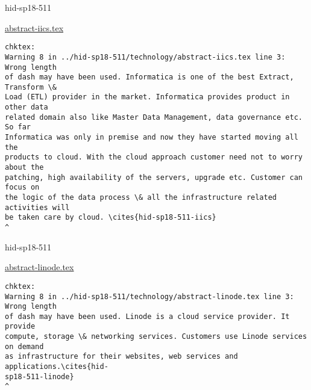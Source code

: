 \begin{IU}

hid-sp18-511

\href{https://github.com/cloudmesh-community/hid-sp18-511/blob/master//technology/abstract-iics.tex}{abstract-iics.tex}

\begin{tiny}
\begin{verbatim}
chktex:
Warning 8 in ../hid-sp18-511/technology/abstract-iics.tex line 3: Wrong length
of dash may have been used. Informatica is one of the best Extract, Transform \&
Load (ETL) provider in the market. Informatica provides product in other data
related domain also like Master Data Management, data governance etc. So far
Informatica was only in premise and now they have started moving all the
products to cloud. With the cloud approach customer need not to worry about the
patching, high availability of the servers, upgrade etc. Customer can focus on
the logic of the data process \& all the infrastructure related activities will
be taken care by cloud. \cites{hid-sp18-511-iics}
^
\end{verbatim}
\end{tiny}
\end{IU}



\begin{IU}

hid-sp18-511

\href{https://github.com/cloudmesh-community/hid-sp18-511/blob/master//technology/abstract-linode.tex}{abstract-linode.tex}

\begin{tiny}
\begin{verbatim}
chktex:
Warning 8 in ../hid-sp18-511/technology/abstract-linode.tex line 3: Wrong length
of dash may have been used. Linode is a cloud service provider. It provide
compute, storage \& networking services. Customers use Linode services on demand
as infrastructure for their websites, web services and applications.\cites{hid-
sp18-511-linode}
^
\end{verbatim}
\end{tiny}
\end{IU}



